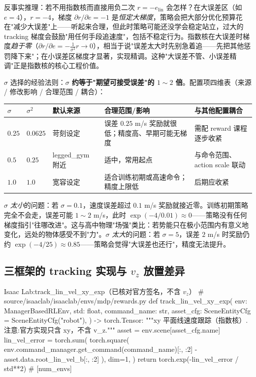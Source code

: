 \begin{insight}\label{ins:rlmc-rew-expgrad}
反事实推理：若不用指数核而直接用负二次 $r=-e_{\text{lin}}$ 会怎样？在大误差区（如 $e=4$），$r=-4$，梯度 $\partial r/\partial e=-1$ 是\emph{恒定大梯度}，策略会把大部分优化预算花在"减少大误差"上——听起来合理，但此时策略可能还没学会稳定站立，过大的 tracking 梯度会鼓励"用任何手段追速度"，包括不稳定行为。指数核在大误差时梯度\emph{趋于零}（$\partial r/\partial e=-\tfrac{1}{\sigma^2}r\to0$），相当于说"误差太大时先别急着追——先把其他惩罚降下来"；在小误差区梯度才显著，实现精调。这种"大误差不管、小误差精调"正是指数核的核心工程价值。
\end{insight}

$\sigma$ 选择的经验法则：\textbf{$\sigma$ 约等于"期望可接受误差"的 $1\!\sim\!2$ 倍}。配置项四维表（来源 / 修改影响 / 合理范围 / 耦合）：

\begin{center}
\small
\begin{tabularx}{\linewidth}{@{}llLLL@{}}
\toprule
$\sigma$ & $\sigma^2$ & 默认来源 & 合理范围/影响 & 与其他配置耦合 \\
\midrule
$0.25$ & $0.0625$ & 苛刻设定 & 误差 $0.25$ m/s 奖励就很低；精度高、早期可能无梯度 & 需配 reward 课程逐步收紧 \\
$0.5$ & $0.25$ & legged\_gym 附近\,\cite{rudin2021minutes} & 适中，常用起点 & 与命令范围、action scale 联动 \\
$1.0$ & $1.0$ & 宽容设定 & 适合训练初期或高速命令；精度上限低 & 后期应收紧 \\
\bottomrule
\end{tabularx}
\end{center}

$\sigma$ \emph{太小}的问题：若 $\sigma=0.1$，速度误差超过 $0.1$ m/s 奖励就接近零。训练初期策略完全不会走，误差可能 $1\!\sim\!2$ m/s，此时 $\exp(-4/0.01)\approx0$——策略没有任何梯度指引"往哪改进"。这与高中物理"场强"类比：若势能只在极小范围内有意义地变化，远处的物体感受不到"力"。$\sigma$ \emph{太大}的问题：若 $\sigma=5$，误差 $2$ m/s 时奖励仍约 $\exp(-4/25)\approx0.85$——策略会觉得"大误差也还行"，精度无法提升。

\subsection{\texorpdfstring{三框架的 tracking 实现与 $v_z$ 放置差异}{三框架的 tracking 实现与 vz 放置差异}}
\label{sec:rlmc-rew-trackimpl}

\begin{codebox}[Python]{Isaac Lab:track\_lin\_vel\_xy\_exp（已核对官方签名，不含 $v_z$）}
# source/isaaclab/isaaclab/envs/mdp/rewards.py
def track_lin_vel_xy_exp(
    env: ManagerBasedRLEnv, std: float, command_name: str,
    asset_cfg: SceneEntityCfg = SceneEntityCfg("robot"),
) -> torch.Tensor:
    """xy 平面线速度跟踪（指数核）.注意:官方实现只含 xy，不含 v_z."""
    asset = env.scene[asset_cfg.name]
    lin_vel_error = torch.sum(
        torch.square(
            env.command_manager.get_command(command_name)[:, :2]
            - asset.data.root_lin_vel_b[:, :2]
        ), dim=1,
    )
    return torch.exp(-lin_vel_error / std**2)            # [num_envs]
\end{codebox}

